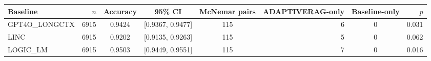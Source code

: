 \begin{tabular}{lrcccrcr}
\toprule
Baseline & $n$ & Accuracy & 95\% CI & McNemar pairs & ADAPTIVERAG-only & Baseline-only & $p$ \\
\midrule
GPT4O\_LONGCTX & 6915 & 0.9424 & [0.9367, 0.9477] & 115 & 6 & 0 & 0.031 \\
LINC & 6915 & 0.9202 & [0.9135, 0.9263] & 115 & 5 & 0 & 0.062 \\
LOGIC\_LM & 6915 & 0.9503 & [0.9449, 0.9551] & 115 & 7 & 0 & 0.016 \\
\bottomrule
\end{tabular}